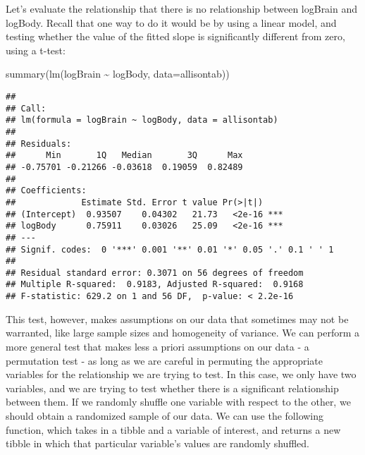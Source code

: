 \documentclass[
]{book}
\newenvironment{Shaded}{\begin{snugshade}}{\end{snugshade}}
\newcommand{\AttributeTok}[1]{\textcolor[rgb]{0.77,0.63,0.00}{#1}}
\newcommand{\FunctionTok}[1]{\textcolor[rgb]{0.00,0.00,0.00}{#1}}
\newcommand{\NormalTok}[1]{#1}
\newcommand{\SpecialCharTok}[1]{\textcolor[rgb]{0.00,0.00,0.00}{#1}}
\begin{document}
Let's evaluate the relationship that there is no relationship between logBrain and logBody. Recall that one way to do it would be by using a linear model, and testing whether the value of the fitted slope is significantly different from zero, using a t-test:

\begin{Shaded}
\begin{Highlighting}[]
\FunctionTok{summary}\NormalTok{(}\FunctionTok{lm}\NormalTok{(logBrain }\SpecialCharTok{\textasciitilde{}}\NormalTok{ logBody, }\AttributeTok{data=}\NormalTok{allisontab))}
\end{Highlighting}
\end{Shaded}

\begin{verbatim}
## 
## Call:
## lm(formula = logBrain ~ logBody, data = allisontab)
## 
## Residuals:
##      Min       1Q   Median       3Q      Max 
## -0.75701 -0.21266 -0.03618  0.19059  0.82489 
## 
## Coefficients:
##             Estimate Std. Error t value Pr(>|t|)    
## (Intercept)  0.93507    0.04302   21.73   <2e-16 ***
## logBody      0.75911    0.03026   25.09   <2e-16 ***
## ---
## Signif. codes:  0 '***' 0.001 '**' 0.01 '*' 0.05 '.' 0.1 ' ' 1
## 
## Residual standard error: 0.3071 on 56 degrees of freedom
## Multiple R-squared:  0.9183, Adjusted R-squared:  0.9168 
## F-statistic: 629.2 on 1 and 56 DF,  p-value: < 2.2e-16
\end{verbatim}

This test, however, makes assumptions on our data that sometimes may not be warranted, like large sample sizes and homogeneity of variance. We can perform a more general test that makes less a priori assumptions on our data - a permutation test - as long as we are careful in permuting the appropriate variables for the relationship we are trying to test. In this case, we only have two variables, and we are trying to test whether there is a significant relationship between them. If we randomly shuffle one variable with respect to the other, we should obtain a randomized sample of our data. We can use the following function, which takes in a tibble and a variable of interest, and returns a new tibble in which that particular variable's values are randomly shuffled.
\end{document}
